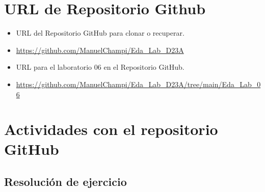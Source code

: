 \documentclass{article}
\begin{document}
	
	
		
	
	
	\section{URL de Repositorio Github}
	\begin{itemize}
		\item URL del Repositorio GitHub para clonar o recuperar.
		\item \url{https://github.com/ManuelChampi/Eda_Lab_D23A}
		\item URL para el laboratorio 06 en el Repositorio GitHub.
		\item \url{https://github.com/ManuelChampi/Eda_Lab_D23A/tree/main/Eda_Lab_06}
	\end{itemize}
	\clearpage
	\section{Actividades con el repositorio GitHub}
	
	\subsection{Resolución de ejercicio}
\end{document}

